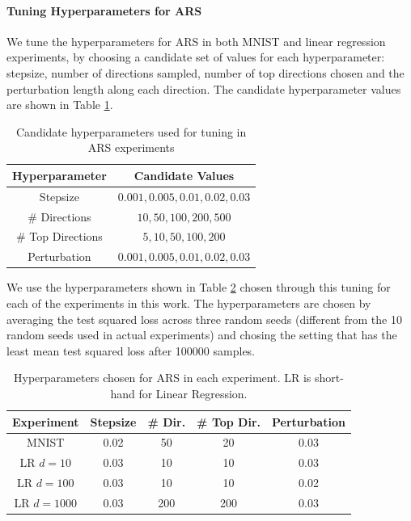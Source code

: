 \paragraph{Tuning Hyperparameters for ARS}
We tune the hyperparameters for ARS \citep{mania2018simple} in both MNIST and linear regression experiments, by choosing a candidate set of values for each hyperparameter: stepsize, number of directions sampled, number of top directions chosen and the perturbation length along each direction. The candidate hyperparameter values are shown in Table \ref{tab:hyperparam}.

\begin{table}[ht]
    \centering
    \begin{tabular}{|c|c|}
      \hline
      \textbf{Hyperparameter} & \textbf{Candidate Values}\\
    \hline
    Stepsize &  $0.001, 0.005, 0.01, 0.02, 0.03$\\
    \hline
    \# Directions &  $10, 50, 100, 200, 500$\\
    \hline
    \# Top Directions & $5, 10, 50, 100, 200$\\
    \hline
    Perturbation & $0.001, 0.005, 0.01, 0.02, 0.03$ \\
    \hline
    \end{tabular}
    \caption{Candidate hyperparameters used for tuning in ARS  experiments}
    \label{tab:hyperparam}
\end{table}

We use the hyperparameters shown in Table \ref{tab:chosen-hyperparams} chosen through this tuning for each of the experiments in this work. The hyperparameters are chosen by averaging the test squared loss across three random seeds (different from the 10 random seeds used in actual experiments) and chosing the setting that has the least mean test squared loss after 100000 samples.

\begin{table}[ht]
    \centering
    \begin{tabular}{|c|c|c|c|c|}
    \hline
    \textbf{Experiment} & \textbf{Stepsize} & \textbf{\# Dir}. & \textbf{\# Top Dir.} & \textbf{Perturbation}\\
    \hline
    MNIST     &  0.02 & 50 & 20 & 0.03\\
    \hline
    LR $d=10$     & 0.03 & 10 & 10 & 0.03 \\
    \hline
    LR $d=100$ & 0.03 & 10 & 10 & 0.02 \\
    \hline
    LR $d=1000$ & 0.03 & 200 & 200 & 0.03 \\
    \hline
    \end{tabular}
    \caption{Hyperparameters chosen for ARS in each experiment. LR is short-hand for Linear Regression.}
    \label{tab:chosen-hyperparams}
\end{table}

